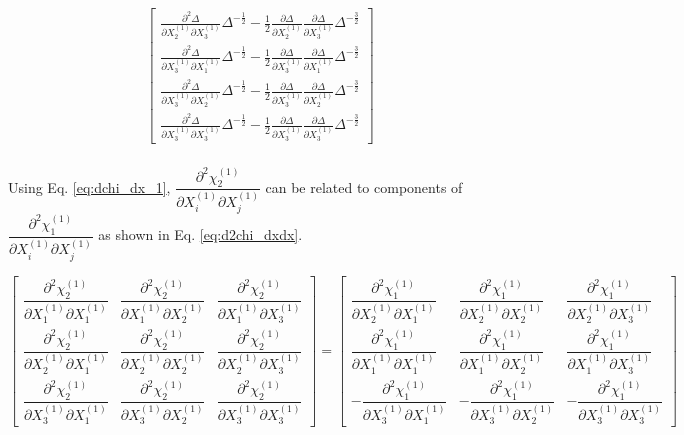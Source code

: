 \documentclass[12pt]{amsart}
\begin{document}
\begin{equation}
\begin{split}
\begin{bmatrix}
      \frac{\partial^2\Delta}{\partial X_2^{(1)} \partial X_3^{(1)}} \Delta^{-\frac{1}{2}} - \frac{1}{2}\frac{\partial\Delta}{\partial X_2^{(1)}} \frac{\partial\Delta}{\partial X_3^{(1)}} \Delta^{-\frac{3}{2}}\\
      \frac{\partial^2\Delta}{\partial X_3^{(1)} \partial X_1^{(1)}} \Delta^{-\frac{1}{2}} - \frac{1}{2}\frac{\partial\Delta}{\partial X_3^{(1)}} \frac{\partial\Delta}{\partial X_1^{(1)}} \Delta^{-\frac{3}{2}}\\
      \frac{\partial^2\Delta}{\partial X_3^{(1)} \partial X_2^{(1)}} \Delta^{-\frac{1}{2}} - \frac{1}{2}\frac{\partial\Delta}{\partial X_3^{(1)}} \frac{\partial\Delta}{\partial X_2^{(1)}} \Delta^{-\frac{3}{2}}\\
      \frac{\partial^2\Delta}{\partial X_3^{(1)} \partial X_3^{(1)}} \Delta^{-\frac{1}{2}} - \frac{1}{2}\frac{\partial\Delta}{\partial X_3^{(1)}} \frac{\partial\Delta}{\partial X_3^{(1)}} \Delta^{-\frac{3}{2}}
    \end{bmatrix}\\
  \end{split}
\end{equation}

Using Eq. \ref{eq:dchi_dx_1}, $\dfrac{\partial^2\chi_2^{(1)}}{\partial X_i^{(1)} \partial X_j^{(1)}}$ can be related to components of  $\dfrac{\partial^2\chi_1^{(1)}}{\partial X_i^{(1)} \partial X_j^{(1)}}$ as shown in Eq. \ref{eq:d2chi_dxdx}.

\begin{equation}
  \label{eq:d2chi_dxdx_2}
  \begin{bmatrix}
    \dfrac{\partial^2\chi^{(1)}_2}{\partial X^{(1)}_1\partial X^{(1)}_1}&\dfrac{\partial^2\chi^{(1)}_2}{\partial X^{(1)}_1\partial X^{(1)}_2}&\dfrac{\partial^2\chi^{(1)}_2}{\partial X^{(1)}_1\partial X^{(1)}_3}\\
    \dfrac{\partial^2\chi^{(1)}_2}{\partial X^{(1)}_2\partial X^{(1)}_1}&\dfrac{\partial^2\chi^{(1)}_2}{\partial X^{(1)}_2\partial X^{(1)}_2}&\dfrac{\partial^2\chi^{(1)}_2}{\partial X^{(1)}_2\partial X^{(1)}_3}\\
    \dfrac{\partial^2\chi^{(1)}_2}{\partial X^{(1)}_3\partial X^{(1)}_1}&\dfrac{\partial^2\chi^{(1)}_2}{\partial X^{(1)}_3\partial X^{(1)}_2}&\dfrac{\partial^2\chi^{(1)}_2}{\partial X^{(1)}_3\partial X^{(1)}_3}
  \end{bmatrix}
  =
  \begin{bmatrix}
    \dfrac{\partial^2\chi^{(1)}_1}{\partial X^{(1)}_2\partial X^{(1)}_1}&\dfrac{\partial^2\chi^{(1)}_1}{\partial X^{(1)}_2\partial X^{(1)}_2}&\dfrac{\partial^2\chi^{(1)}_1}{\partial X^{(1)}_2\partial X^{(1)}_3}\\
    \dfrac{\partial^2\chi^{(1)}_1}{\partial X^{(1)}_1\partial X^{(1)}_1}&\dfrac{\partial^2\chi^{(1)}_1}{\partial X^{(1)}_1\partial X^{(1)}_2}&\dfrac{\partial^2\chi^{(1)}_1}{\partial X^{(1)}_1\partial X^{(1)}_3}\\
   -\dfrac{\partial^2\chi^{(1)}_1}{\partial X^{(1)}_3\partial X^{(1)}_1}&-\dfrac{\partial^2\chi^{(1)}_1}{\partial X^{(1)}_3\partial X^{(1)}_2}&-\dfrac{\partial^2\chi^{(1)}_1}{\partial X^{(1)}_3\partial X^{(1)}_3}
  \end{bmatrix}
\end{equation}
\end{document}
